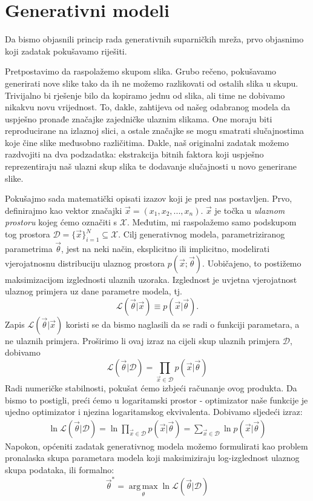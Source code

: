 \section{Generativni modeli}
Da bismo objasnili princip rada generativnih suparničkih mreža, prvo objasnimo koji zadatak pokušavamo riješiti.

Pretpostavimo da raspolažemo skupom slika. Grubo rečeno, pokušavamo generirati nove slike tako da ih ne možemo razlikovati od ostalih slika u skupu. Trivijalno bi rješenje bilo da kopiramo jednu od slika, ali time ne dobivamo nikakvu novu vrijednost. To, dakle, zahtijeva od našeg odabranog modela da uspješno pronađe značajke zajedničke ulaznim slikama. One moraju biti reproducirane na izlaznoj slici, a ostale značajke se mogu smatrati slučajnostima koje čine slike međusobno različitima. Dakle, naš originalni zadatak možemo razdvojiti na dva podzadatka: ekstrakcija bitnih faktora koji uspješno reprezentiraju naš ulazni skup slika te dodavanje slučajnosti u novo generirane slike. 

Pokušajmo sada matematički opisati izazov koji je pred nas postavljen. Prvo, definirajmo kao vektor značajki $\vec{x} = (x_1, x_2, ..., x_n)$. $\vec{x}$ je točka u \textit{ulaznom prostoru} kojeg ćemo označiti s $\mathcal{X}$. Međutim, mi raspolažemo samo podskupom tog prostora $\mathcal{D} = \{\vec{x}\}_{i=1}^N \subseteq \mathcal{X}$. Cilj generativnog modela, parametriziranog parametrima $\vec{\theta}$, jest na neki način, eksplicitno ili implicitno, modelirati vjerojatnosnu distribuciju ulaznog prostora $p(\vec{x};\vec{\theta})$. Uobičajeno, to postižemo maksimizacijom izglednosti ulaznih uzoraka. Izglednost je uvjetna vjerojatnost ulaznog primjera uz dane parametre modela, tj.
\begin{equation*}
	\mathcal{L}(\vec{\theta}|\vec{x}) \equiv p(\vec{x}|\vec{\theta}) .
\end{equation*}
Zapis $\mathcal{L}(\vec{\theta}|\vec{x})$ koristi se da bismo naglasili da se radi o funkciji parametara, a ne ulaznih primjera. Proširimo li ovaj izraz na cijeli skup ulaznih primjera $\mathcal{D}$, dobivamo
\begin{equation*}
	\mathcal{L}(\vec{\theta}|\mathcal{D}) = \prod_{\vec{x} \in \mathcal{D}} p(\vec{x}|\vec{\theta})
\end{equation*}
Radi numeričke stabilnosti, pokušat ćemo izbjeći računanje ovog produkta. Da bismo to postigli, preći ćemo u logaritamski prostor - optimizator naše funkcije je ujedno optimizator i njezina logaritamskog ekvivalenta. Dobivamo sljedeći izraz:
\begin{align*}
	\ln \mathcal{L}(\vec{\theta}|\mathcal{D}) 
	= \ln \prod_{\vec{x} \in \mathcal{D}} p(\vec{x}|\vec{\theta})
	= \sum_{\vec{x} \in \mathcal{D}}\ln p(\vec{x}|\vec{\theta})
\end{align*}
Napokon, općeniti zadatak generativnog modela možemo formulirati kao problem pronalaska skupa parametara modela koji maksimiziraju log-izglednost ulaznog skupa podataka, ili formalno:
\begin{equation*}
	\vec{\theta}^* = \operatorname*{arg\,max}_\theta \ln \mathcal{L}(\vec{\theta}|\mathcal{D})
\end{equation*}

